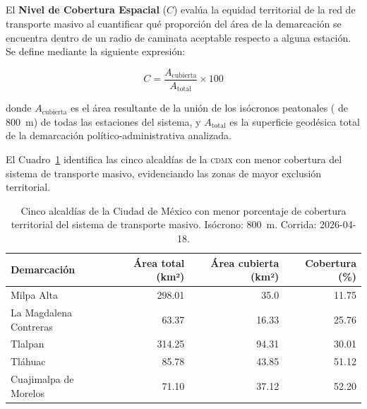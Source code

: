 \subsection{}
\label{subsec:cobertura-espacial}

El \textbf{Nivel de Cobertura Espacial} ($C$) evalúa la equidad territorial de
la red de transporte masivo al cuantificar qué proporción del área de la
demarcación se encuentra dentro de un radio de caminata aceptable respecto a
alguna estación. Se define mediante la siguiente expresión:

\begin{equation}
    C = \frac{A_{\text{cubierta}}}{A_{\text{total}}} \times 100
    \label{eq:cobertura-res}
\end{equation}

donde $A_{\text{cubierta}}$ es el área resultante de la unión de los isócronos
peatonales ( de 800~m) de todas las estaciones del sistema, y
$A_{\text{total}}$ es la superficie geodésica total de la demarcación
político-administrativa analizada.

El Cuadro~\ref{tab:peores-cdmx} identifica las cinco alcaldías de la
\textsc{cdmx} con menor cobertura del sistema de transporte masivo, evidenciando
las zonas de mayor exclusión territorial.

\begin{table}[H]
    \centering
    \caption[Alcaldías con menor cobertura de transporte masivo (CDMX)]{
    Cinco alcaldías de la Ciudad de México con menor porcentaje de cobertura
    territorial del sistema de transporte masivo. Isócrono: 800~m.
    Corrida: 2026-04-18.}
    \label{tab:peores-cdmx}
    \begin{tabular}{|l|r|r|r|}
        \hline
        \textbf{Demarcación} & \textbf{Área total (km²)} &
        \textbf{Área cubierta (km²)} & \textbf{Cobertura (\%)} \\
        \hline
        Milpa Alta              & 298.01 &  35.0    &  11.75 \\
        La Magdalena Contreras  &  63.37 &  16.33   &  25.76 \\
        Tlalpan                 & 314.25 &  94.31   &  30.01 \\
        Tláhuac                 &  85.78 &  43.85   &  51.12 \\
        Cuajimalpa de Morelos   &  71.10 &  37.12   &  52.20 \\
        \hline
    \end{tabular}
\end{table}

